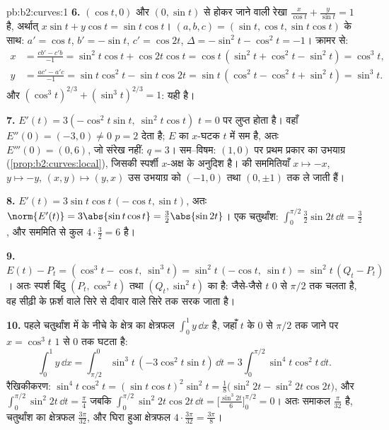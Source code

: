 \begin{solution}{pb:b2:curves:1}
\textbf{6.} $(\cos t, 0)$ और $(0, \sin t)$ से होकर जाने वाली रेखा
$\frac x{\cos t} + \frac y{\sin t} = 1$ है, अर्थात् $x\sin t +
y\cos t = \sin t\cos t$। $(a, b, c) = (\sin t, \cos t,
\sin t\cos t)$ के साथ: $a' = \cos t$, $b' = -\sin t$, $c' = \cos
2t$, $\Delta = -\sin^2 t - \cos^2 t = -1$। क्रामर से:
\begin{align*}
x &= \frac{cb' - c'b}{-1} = \sin^2 t\cos t + \cos 2t\cos t
= \cos t\,(\sin^2 t + \cos^2 t - \sin^2 t) = \cos^3 t,\\
y &= \frac{ac' - a'c}{-1} = \sin t\cos^2 t - \sin t\cos 2t
= \sin t\,(\cos^2 t - \cos^2 t + \sin^2 t) = \sin^3 t .
\end{align*}
और $(\cos^3t)^{2/3} + (\sin^3t)^{2/3} = 1$: यही  है।

\textbf{7.} $E'(t) = 3(-\cos^2 t\sin t,\ \sin^2 t\cos t)$
$t = 0$ पर लुप्त होता है। वहाँ $E''(0) = (-3, 0) \neq 0$ $p = 2$ देता है; $E$ का $x$-घटक $t$ में सम है, अतः
$E'''(0) = (0, 6)$, जो संरेख नहीं: $q = 3$। सम--विषम: $(1, 0)$ पर प्रथम
प्रकार का उभयाग्र
(\cref{prop:b2:curves:local}), जिसकी स्पर्शी
$x$-अक्ष के अनुदिश है।  की सममितियाँ $x \mapsto -x$, $y \mapsto -y$, $(x,
y) \mapsto (y, x)$ उस उभयाग्र को $(-1,
0)$ तथा $(0, \pm1)$ तक ले जाती हैं।

\textbf{8.} $E'(t) = 3\sin t\cos t\,(-\cos t, \sin t)$, अतः
$\norm{E'(t)} = 3\abs{\sin t\cos t} = \tfrac32\abs{\sin 2t}$।
एक चतुर्थांश: $\int_0^{\pi/2}\tfrac32\sin 2t\,\dd t =
\tfrac32$, और सममिति से कुल  $4 \cdot
\tfrac32 = 6$ है।

\textbf{9.} $E(t) - P_t = (\cos^3 t - \cos t,\ \sin^3 t) =
\sin^2 t\,(-\cos t,\ \sin t) = \sin^2 t\,(Q_t - P_t)$। अतः स्पर्श बिंदु $(P_t, \cos^2 t)$ तथा
$(Q_t, \sin^2 t)$ का  है: जैसे-जैसे $t$ $0$ से $\pi/2$ तक चलता
है, वह सीढ़ी के फ़र्श वाले सिरे से दीवार वाले सिरे तक सरक जाता है।

\textbf{10.} पहले चतुर्थांश में  के नीचे के क्षेत्र
का क्षेत्रफल $\int_0^1 y\,\dd x$ है, जहाँ $t$ के $0$ से $\pi/2$ तक जाने पर
$x = \cos^3 t$ $1$ से $0$ तक घटता है:
\[
\int_0^1 y\,\dd x
= \int_{\pi/2}^{0}\sin^3 t\,(-3\cos^2 t\sin t)\,\dd t
= 3\int_0^{\pi/2}\sin^4 t\cos^2 t\,\dd t .
\]
रैखिकीकरण: $\sin^4 t\cos^2 t = (\sin t\cos t)^2\sin^2 t =
\tfrac18\bigl(\sin^2 2t - \sin^2 2t\cos 2t\bigr)$, और
$\int_0^{\pi/2}\sin^2 2t\,\dd t = \tfrac\pi4$ जबकि
$\int_0^{\pi/2}\sin^2 2t\cos 2t\,\dd t =
\bigl[\tfrac{\sin^3 2t}6\bigr]_0^{\pi/2} = 0$। अतः
समाकल $\tfrac\pi{32}$ है, चतुर्थांश का क्षेत्रफल
$\tfrac{3\pi}{32}$, और घिरा हुआ क्षेत्रफल $4 \cdot
\tfrac{3\pi}{32} = \tfrac{3\pi}8$।


\end{solution}
